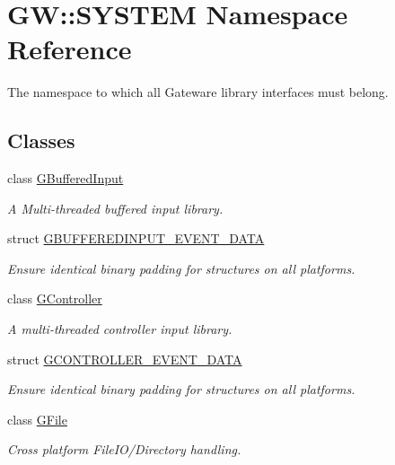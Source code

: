 \hypertarget{namespaceGW_1_1SYSTEM}{}\section{GW\+::S\+Y\+S\+T\+EM Namespace Reference}
\label{namespaceGW_1_1SYSTEM}


The namespace to which all Gateware library interfaces must belong.  


\subsection*{Classes}
\begin{DoxyCompactItemize}
\item 
class \mbox{\hyperlink{classGW_1_1SYSTEM_1_1GBufferedInput}{G\+Buffered\+Input}}
\begin{DoxyCompactList}\small\item\em A Multi-\/threaded buffered input library. \end{DoxyCompactList}\item 
struct \mbox{\hyperlink{structGW_1_1SYSTEM_1_1GBUFFEREDINPUT__EVENT__DATA}{G\+B\+U\+F\+F\+E\+R\+E\+D\+I\+N\+P\+U\+T\+\_\+\+E\+V\+E\+N\+T\+\_\+\+D\+A\+TA}}
\begin{DoxyCompactList}\small\item\em Ensure identical binary padding for structures on all platforms. \end{DoxyCompactList}\item 
class \mbox{\hyperlink{classGW_1_1SYSTEM_1_1GController}{G\+Controller}}
\begin{DoxyCompactList}\small\item\em A multi-\/threaded controller input library. \end{DoxyCompactList}\item 
struct \mbox{\hyperlink{structGW_1_1SYSTEM_1_1GCONTROLLER__EVENT__DATA}{G\+C\+O\+N\+T\+R\+O\+L\+L\+E\+R\+\_\+\+E\+V\+E\+N\+T\+\_\+\+D\+A\+TA}}
\begin{DoxyCompactList}\small\item\em Ensure identical binary padding for structures on all platforms. \end{DoxyCompactList}\item 
class \mbox{\hyperlink{classGW_1_1SYSTEM_1_1GFile}{G\+File}}
\begin{DoxyCompactList}\small\item\em Cross platform File\+I\+O/\+Directory handling. \end{DoxyCompactList}\item 

\end{DoxyCompactItemize}
